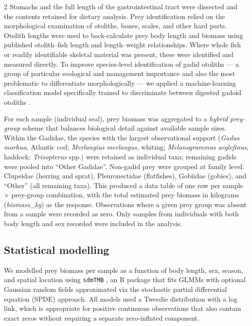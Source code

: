 \begin{spacing}{2}
Stomachs and the full length of the gastrointestinal tract were dissected
and the contents retained for dietary analysis. Prey identification relied
on the morphological examination of otoliths, bones, scales, and other hard
parts. Otolith lengths were used to back-calculate prey body length and
biomass using published otolith--fish length and length--weight
relationships. Where whole fish or readily identifiable skeletal material
was present, these were identified and measured directly. To improve
species-level identification of gadid otoliths --- a group of particular
ecological and management importance and also the most problematic to
differentiate morphologically --- we applied a machine-learning
classification model specifically trained to discriminate between digested
gadoid otoliths \citep{MionOtolith2024}.

For each sample (individual seal), prey biomass was aggregated to a
\textit{hybrid prey-group} scheme that balances biological detail against
available sample sizes. Within the Gadidae, the species with the largest
observational support (\textit{Gadus morhua}, Atlantic cod;
\textit{Merlangius merlangus}, whiting; \textit{Melanogrammus aeglefinus},
haddock; \textit{Trisopterus} spp.) were retained as individual taxa;
remaining gadids were pooled into ``Other Gadidae''. Non-gadid prey were
grouped at family level: Clupeidae (herring and sprat), Pleuronectidae
(flatfishes), Gobiidae (gobies), and ``Other'' (all remaining taxa). This
produced a data table of one row per sample $\times$ prey-group combination,
with the total estimated prey biomass in kilograms (\textit{biomass\_kg}) as
the response. Observations where a given prey group was absent from a sample
were recorded as zero. Only samples from individuals with both body length
and sex recorded were included in the analysis.

\subsection{Statistical modelling}

We modelled prey biomass per sample as a function of body length, sex,
season, and spatial location using \texttt{sdmTMB} \citep{Anderson2024},
an R package that fits GLMMs with optional Gaussian random fields
approximated via the stochastic partial differential equation (SPDE)
approach. All models used a Tweedie distribution with a log link, which is
appropriate for positive continuous observations that also contain exact
zeros without requiring a separate zero-inflated component.


\end{spacing}
